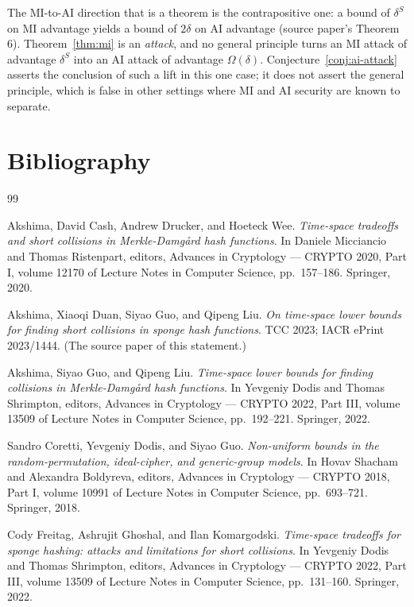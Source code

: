 \documentclass{conjura-conjecture}
\begin{document}
\begin{remark}\label{rem:lift}
The MI-to-AI direction that is a theorem is the contrapositive one:
a bound of $\delta^{S}$ on MI advantage yields a bound of $2\delta$ on
AI advantage (source paper's Theorem 6). Theorem~\ref{thm:mi} is an
\emph{attack}, and no general principle turns an MI attack of
advantage $\delta^{S}$ into an AI attack of advantage $\Omega(\delta)$.
Conjecture~\ref{conj:ai-attack} asserts the conclusion of such a lift
in this one case; it does not assert the general principle, which is
false in other settings where MI and AI security are known to
separate.
\end{remark}

\section{Bibliography}

\begin{conjurabibliography}{99}

Akshima, David Cash, Andrew Drucker, and Hoeteck Wee.
\emph{Time-space tradeoffs and short collisions in Merkle-Damg\aa{}rd
hash functions}.
In Daniele Micciancio and Thomas Ristenpart, editors, Advances in
Cryptology --- CRYPTO 2020, Part I, volume 12170 of Lecture Notes in
Computer Science, pp.\ 157--186. Springer, 2020.

Akshima, Xiaoqi Duan, Siyao Guo, and Qipeng Liu.
\emph{On time-space lower bounds for finding short collisions in sponge
hash functions}.
TCC 2023; IACR ePrint 2023/1444. (The source paper of this statement.)

Akshima, Siyao Guo, and Qipeng Liu.
\emph{Time-space lower bounds for finding collisions in
Merkle-Damg\aa{}rd hash functions}.
In Yevgeniy Dodis and Thomas Shrimpton, editors, Advances in Cryptology
--- CRYPTO 2022, Part III, volume 13509 of Lecture Notes in Computer
Science, pp.\ 192--221. Springer, 2022.

Sandro Coretti, Yevgeniy Dodis, and Siyao Guo.
\emph{Non-uniform bounds in the random-permutation, ideal-cipher, and
generic-group models}.
In Hovav Shacham and Alexandra Boldyreva, editors, Advances in
Cryptology --- CRYPTO 2018, Part I, volume 10991 of Lecture Notes in
Computer Science, pp.\ 693--721. Springer, 2018.

Cody Freitag, Ashrujit Ghoshal, and Ilan Komargodski.
\emph{Time-space tradeoffs for sponge hashing: attacks and limitations
for short collisions}.
In Yevgeniy Dodis and Thomas Shrimpton, editors, Advances in Cryptology
--- CRYPTO 2022, Part III, volume 13509 of Lecture Notes in Computer
Science, pp.\ 131--160. Springer, 2022.

\end{conjurabibliography}
\end{document}
